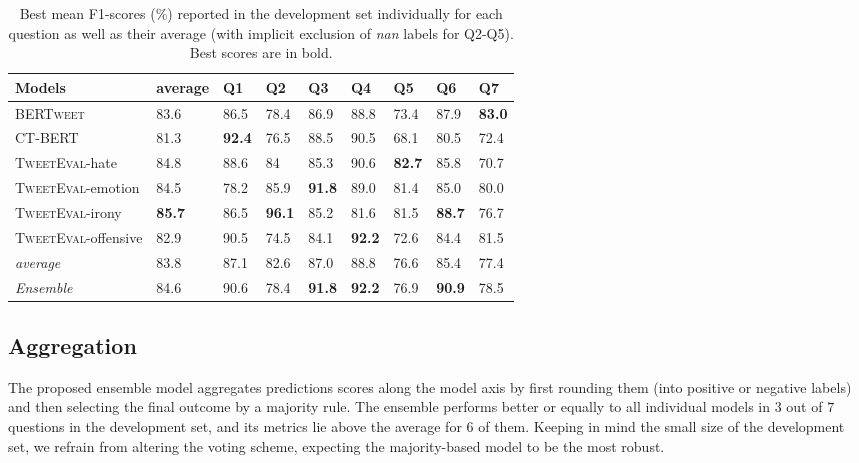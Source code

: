 \documentclass[11pt,a4paper]{article}
\begin{document}
\begin{table*}[!h]
    \centering
    \small
    \renewcommand{\arraystretch}{1.05}
\begin{tabularx}{0.95\textwidth}{@{}LMMMMMMMM@{}}
    {\textbf{Models}} & \textbf{average} & \textbf{Q1} & \textbf{Q2} & \textbf{Q3} & \textbf{Q4} & \textbf{Q5} & \textbf{Q6} & \textbf{Q7} \\
    \toprule
    \textsc{BERTweet } &83.6&86.5&78.4&86.9&88.8&73.4&87.9&\textbf{83.0}\\ 
    \textsc{CT-BERT} &81.3&\textbf{92.4}&76.5&88.5&90.5&68.1&80.5&72.4 \\
    \textsc{TweetEval}-hate &84.8&88.6&84&85.3&90.6&\textbf{82.7}&85.8&70.7 \\
    \textsc{TweetEval}-emotion &84.5&78.2&85.9&\textbf{91.8}&89.0&81.4&85.0&80.0 \\
    \textsc{TweetEval}-irony &\textbf{85.7}&86.5&\textbf{96.1}&85.2&81.6&81.5&\bf88.7&76.7 \\
    \textsc{TweetEval}-offensive &82.9&90.5&74.5&84.1&\textbf{92.2}&72.6&84.4&81.5 \\
    \midrule
    \emph{average} & 83.8 & 87.1 & 82.6 & 87.0 & 88.8 & 76.6 & 85.4 & 77.4\\
    \midrule 
    \emph{Ensemble} &84.6&90.6&78.4&\textbf{91.8}&\textbf{92.2}&76.9&\textbf{90.9}&78.5 \\
    \bottomrule
\end{tabularx}    \caption{Best mean F1-scores (\%) reported in the development set individually for each question as well as their average (with implicit exclusion of \textit{nan} labels for Q2-Q5). Best scores are in bold.}
    \label{tab:results}
\end{table*}

\subsection{Aggregation}
The proposed ensemble model aggregates predictions scores along the 
model axis by first rounding them (into positive or negative labels) and then selecting the final outcome by a majority rule.
The ensemble performs better or equally to all individual models in $3$ out of $7$ questions in the development set, and its metrics lie above the average for $6$ of them.
Keeping in mind the small size of the development set, we refrain from altering the voting scheme, expecting the majority-based model to be the most robust.
\end{document}
